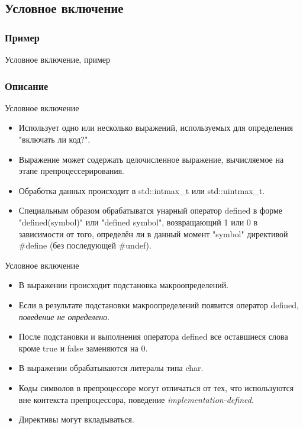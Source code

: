     \subsection{Условное включение}
    \subsubsection{Пример}
    \begin{frame}{Условное включение, пример}
        
    \end{frame}
    \subsubsection{Описание}
    \begin{frame}{Условное включение}
        \begin{itemize}
            \item Использует одно или несколько выражений, используемых для определения "включать ли код?".
            \item Выражение может содержать целочисленное выражение, вычисляемое на этапе препроцессерирования.
            \item Обработка данных происходит в std::intmax\_t или std::uintmax\_t.
            \item Специальным образом обрабатыватся унарный оператор defined в форме "defined(symbol)" или "defined symbol",
                возвращающий 1 или 0 в зависимости от того, определён ли в данный момент "symbol" директивой \#define (без последующей \#undef).
        \end{itemize}
    \end{frame}
    \begin{frame}{Условное включение}
        \begin{itemize}
            \item В выражении происходит подстановка макроопределений.
            \item Если в результате подстановки макроопределений появится оператор defined, \textit{поведение не определено}.
            \item После подстановки и выполнения оператора defined все оставшиеся слова кроме true и false заменяются на 0.
            \item В выражении обрабатываются литералы типа char.
            \item Коды символов в препроцессоре могут отличаться от тех, что используются вне контекста препроцессора, поведение \textit{implementation-defined}.
            \item Директивы могут вкладываться.
        \end{itemize}
    \end{frame}
